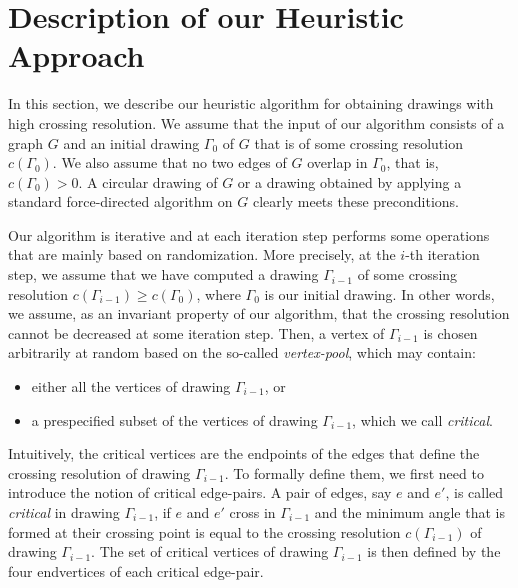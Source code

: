 \documentclass[runningheads]{llncs}
\begin{document}
\section{Description of our Heuristic Approach}
\label{sec:algorithm}

In this section, we describe our heuristic algorithm for obtaining drawings with high crossing resolution. We assume that the input of our algorithm consists of a graph $G$ and an initial drawing $\Gamma_0$ of $G$ that is of some crossing resolution $c(\Gamma_0)$. We also assume that no two edges of $G$ overlap in $\Gamma_0$, that is, $c(\Gamma_0)>0$. A circular drawing of $G$ or a drawing obtained by applying a standard force-directed algorithm on $G$ clearly meets these preconditions. 

Our algorithm is iterative and at each iteration step performs some operations that are mainly based on randomization. More precisely, at the $i$-th iteration step, we assume that we have computed a drawing $\Gamma_{i-1}$ of some crossing resolution $c(\Gamma_{i-1}) \geq c(\Gamma_0)$, where $\Gamma_0$ is our initial drawing. In other words, we assume, as an invariant property of our algorithm, that the crossing resolution cannot be decreased at some iteration step. Then, a vertex of $\Gamma_{i-1}$ is chosen arbitrarily at random based on the so-called \emph{vertex-pool}, which may contain:

\begin{itemize}
\item either all the vertices of drawing $\Gamma_{i-1}$, or
\item a prespecified subset of the vertices of drawing $\Gamma_{i-1}$, which we call \emph{critical}.
\end{itemize}

Intuitively, the critical vertices are the endpoints of the edges that define the crossing resolution of drawing $\Gamma_{i-1}$. To formally define them, we first need to introduce the notion of critical edge-pairs. A pair of edges, say $e$ and $e'$, is called \emph{critical} in drawing $\Gamma_{i-1}$, if $e$ and $e'$ cross in $\Gamma_{i-1}$ and the minimum angle that is formed at their crossing point is equal to the crossing resolution $c(\Gamma_{i-1})$ of drawing $\Gamma_{i-1}$. The set of critical vertices of drawing $\Gamma_{i-1}$ is then defined by the four endvertices of each critical edge-pair.  
\end{document}
